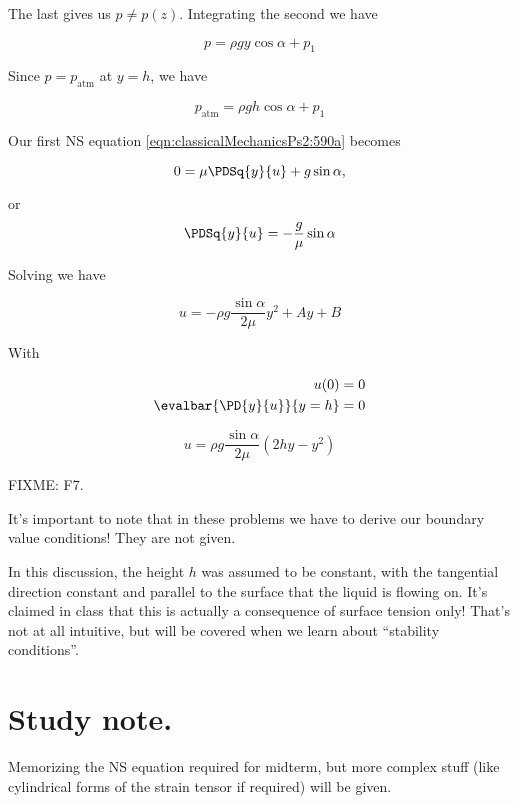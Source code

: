 The last gives us $p \ne p(z)$.  Integrating the second we have

\begin{equation}\label{eqn:continuumL12:410}
p = \rho g y \cos\alpha + p_1
\end{equation}

Since $p = p_{\text{atm}}$ at $y = h$, we have

\begin{equation}\label{eqn:continuumL12:430}
p_{\text{atm}} = \rho g h \cos\alpha + p_1
\end{equation}

Our first NS equation \ref{eqn:classicalMechanicsPs2:590a} becomes

\begin{equation}\label{eqn:continuumL12:450}
0 = \mu \PDSq{y}{u} + g \sin\alpha,
\end{equation}

or
\begin{equation}\label{eqn:continuumL12:470}
\PDSq{y}{u} = -\frac{g}{\mu} \sin\alpha
\end{equation}

Solving we have

\begin{equation}\label{eqn:continuumL12:490}
u = - \rho g \frac{\sin\alpha}{2 \mu} y^2 + A y + B
\end{equation}

With

\begin{align}\label{eqn:continuumL12:510}
u(0) &= 0 \\
\evalbar{\PD{y}{u}}{y = h} &= 0
\end{align}

\begin{equation}\label{eqn:classicalMechanicsPs2:530}
u = \rho g \frac{\sin\alpha}{2 \mu} \left( 2 h y - y^2 \right) 
\end{equation}

FIXME: F7.

It's important to note that in these problems we have to derive our boundary value conditions!  They are not given.

In this discussion, the height $h$ was assumed to be constant, with the tangential direction constant and parallel to the surface that the liquid is flowing on.  It's claimed in class that this is actually a consequence of surface tension only!  That's not at all intuitive, but will be covered when we learn about ``stability conditions''.

\section{Study note.}

Memorizing the NS equation required for midterm, but more complex stuff (like cylindrical forms of the strain tensor if required) will be given.


\EndNoBibArticle
